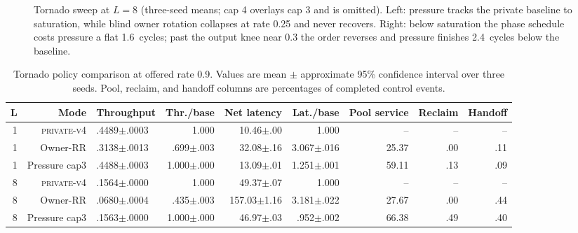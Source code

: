 \documentclass[10pt,twocolumn]{article}
\newcommand{\privatefour}{\textsc{private-v4}\xspace}
\begin{document}
\begin{figure}[t]
\caption{Tornado sweep at $L=8$ (three-seed means; cap 4 overlays cap 3
and is omitted). Left: pressure tracks the private baseline to saturation,
while blind owner rotation collapses at rate 0.25 and never recovers.
Right: below saturation the phase schedule costs pressure a flat
1.6~cycles; past the output knee near 0.3 the order reverses and pressure
finishes 2.4~cycles below the baseline.}
\label{fig:tornado-curve}
\end{figure}

\begin{table}[t]
\centering
\caption{Tornado policy comparison at offered rate 0.9. Values are
mean $\pm$ approximate 95\% confidence interval over three seeds. Pool,
reclaim, and handoff columns are percentages of completed control events.}
\label{tab:tornado}
\scriptsize
\begin{tabular}{rrlrrrrrr}
\toprule
L & Mode & Throughput & Thr./base & Net latency & Lat./base &
Pool service & Reclaim & Handoff\\
\midrule
1 & \privatefour & .4489$\pm$.0003 & 1.000 & 10.46$\pm$.00 & 1.000 & -- & -- & --\\
1 & Owner-RR & .3138$\pm$.0013 & .699$\pm$.003 & 32.08$\pm$.16 & 3.067$\pm$.016 & 25.37 & .00 & .11\\
1 & Pressure cap3 & .4488$\pm$.0003 & 1.000$\pm$.000 & 13.09$\pm$.01 & 1.251$\pm$.001 & 59.11 & .13 & .09\\
\midrule
8 & \privatefour & .1564$\pm$.0000 & 1.000 & 49.37$\pm$.07 & 1.000 & -- & -- & --\\
8 & Owner-RR & .0680$\pm$.0004 & .435$\pm$.003 & 157.03$\pm$1.16 & 3.181$\pm$.022 & 27.67 & .00 & .44\\
8 & Pressure cap3 & .1563$\pm$.0000 & 1.000$\pm$.000 & 46.97$\pm$.03 & .952$\pm$.002 & 66.38 & .49 & .40\\
\bottomrule
\end{tabular}
\end{table}
\end{document}
